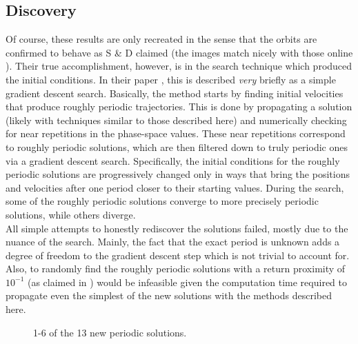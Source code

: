 \documentclass[12pt]{article}
\begin{document}
\subsection{Discovery}

Of course, these results are only recreated in the sense that the orbits are confirmed to behave as S \& D claimed (the images match nicely with those online \cite{3bsite}). Their true accomplishment, however, is in the search technique which produced the initial conditions. In their paper \cite{suv}, this is described \emph{very} briefly as a simple gradient descent search. Basically, the method starts by finding initial velocities that produce roughly periodic trajectories. This is done by propagating a solution (likely with techniques similar to those described here) and numerically checking for near repetitions in the phase-space values. These near repetitions correspond to roughly periodic solutions, which are then filtered down to truly periodic ones via a gradient descent search. Specifically, the initial conditions for the roughly periodic solutions are progressively changed only in ways that bring the positions and velocities after one period closer to their starting values. During the search, some of the roughly periodic solutions converge to more precisely periodic solutions, while others diverge. \\

All simple attempts to honestly rediscover the solutions failed, mostly due to the nuance of the search. Mainly, the fact that the exact period is unknown adds a degree of freedom to the gradient descent step which is not trivial to account for. Also, to randomly find the roughly periodic solutions with a return proximity of $10^{-1}$ (as claimed in \cite{suv}) would be infeasible given the computation time required to propagate even the simplest of the new solutions with the methods described here.

\begin{figure}
 \qquad
{} \qquad
{} \qquad
{} \qquad
{} \qquad
{} \qquad
\caption{1-6 of the 13 new periodic solutions.}
\label{f2}
\end{figure}
\end{document}
